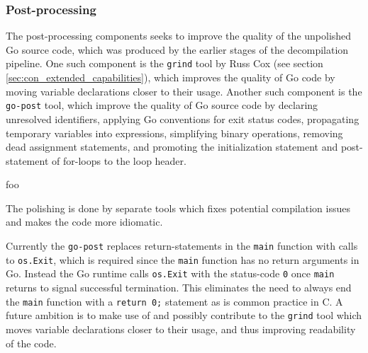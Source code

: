 
\subsubsection{Post-processing}
\label{sec:design_post-processing}

The post-processing components seeks to improve the quality of the unpolished Go source code, which was produced by the earlier stages of the decompilation pipeline. One such component is the \texttt{grind} tool by Russ Cox (see section \ref{sec:con_extended_capabilities}), which improves the quality of Go code by moving variable declarations closer to their usage. Another such component is the \texttt{go-post} tool, which improve the quality of Go source code by declaring unresolved identifiers, applying Go conventions for exit status codes, propagating temporary variables into expressions, simplifying binary operations, removing dead assignment statements, and promoting the initialization statement and post-statement of for-loops to the loop header.


foo

The polishing is done by separate tools which fixes potential compilation issues and makes the code more idiomatic.

Currently the \texttt{go-post} replaces return-statements in the \texttt{main} function with calls to \texttt{os.Exit}, which is required since the \texttt{main} function has no return arguments in Go. Instead the Go runtime calls \texttt{os.Exit} with the status-code \texttt{0} once \texttt{main} returns to signal successful termination. This eliminates the need to always end the \texttt{main} function with a \texttt{return 0;} statement as is common practice in C. A future ambition is to make use of and possibly contribute to the \texttt{grind} tool which moves variable declarations closer to their usage, and thus improving readability of the code.
